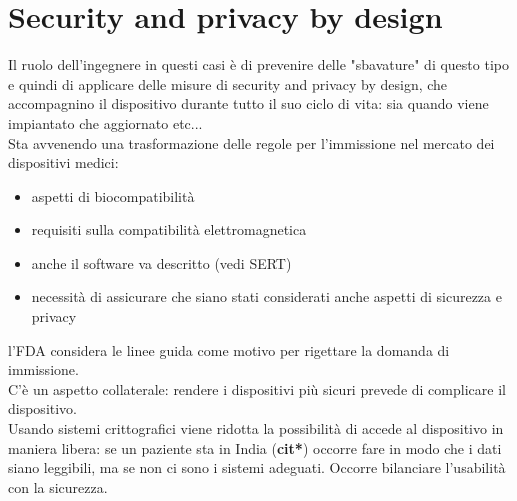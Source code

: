\documentclass[oneside, 12pt]{extbook}
\begin{document}
\section{Security and privacy by design}
Il ruolo dell'ingegnere in questi casi è di prevenire delle "sbavature" di questo tipo e quindi di applicare delle misure di security and privacy by design, che accompagnino il dispositivo durante tutto il suo ciclo di vita: sia quando viene impiantato che aggiornato etc...\\Sta avvenendo una trasformazione delle regole per l'immissione nel mercato dei dispositivi medici:
\begin{itemize}
	\item aspetti di biocompatibilità
	\item requisiti sulla compatibilità elettromagnetica
	\item anche il software va descritto (vedi SERT)
	\item necessità di assicurare che siano stati considerati anche aspetti di sicurezza e privacy
\end{itemize}
l'FDA considera le linee guida come motivo per rigettare la domanda di immissione.\\C'è un aspetto collaterale: rendere i dispositivi più sicuri prevede di complicare il dispositivo.\\Usando sistemi crittografici viene ridotta la possibilità di accede al dispositivo in maniera libera: se un paziente sta in India (\textbf{cit*}) occorre fare in modo che i dati siano leggibili, ma se non ci sono i sistemi adeguati. Occorre bilanciare l'usabilità con la sicurezza.
\end{document}
